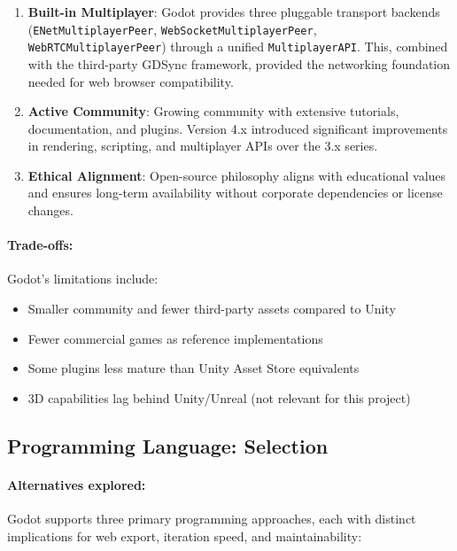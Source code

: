 \begin{enumerate}
    \item \textbf{Built-in Multiplayer}: Godot provides three pluggable transport backends (\texttt{ENet\-Multiplayer\-Peer}, \texttt{WebSocket\-Multiplayer\-Peer}, \texttt{WebRTC\-Multiplayer\-Peer}) through a unified \texttt{MultiplayerAPI}. This, combined with the third-party GDSync framework, provided the networking foundation needed for web browser compatibility.

    \item \textbf{Active Community}: Growing community with extensive tutorials, documentation, and plugins. Version 4.x introduced significant improvements in rendering, scripting, and multiplayer APIs over the 3.x series.

    \item \textbf{Ethical Alignment}: Open-source philosophy aligns with educational values and ensures long-term availability without corporate dependencies or license changes.
\end{enumerate}

\paragraph*{Trade-offs:}

Godot's limitations include:
\begin{itemize}
    \item Smaller community and fewer third-party assets compared to Unity
    \item Fewer commercial games as reference implementations
    \item Some plugins less mature than Unity Asset Store equivalents
    \item 3D capabilities lag behind Unity/Unreal (not relevant for this project)
\end{itemize}

\subsection{Programming Language: Selection}
\label{subsec:gdscript-selection}

\paragraph*{Alternatives explored:}

Godot supports three primary programming approaches, each with distinct implications for web export, iteration speed, and maintainability:

